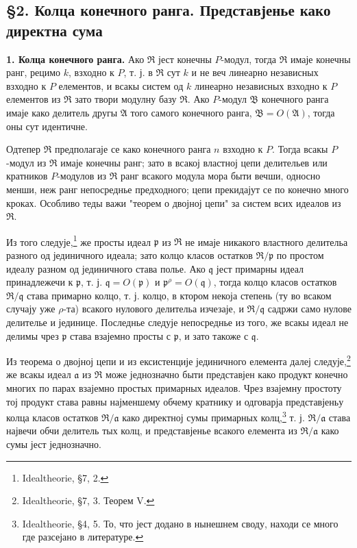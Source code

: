 \documentclass[11pt]{article}
\begin{document}
\setcounter{footnote}{16}

\subsection*{\S 2. Колца конечного ранга. Представјенье како директна сума}

\textbf{1. Колца конечного ранга.} Ако $\mathfrak R$ јест конечны $P$-модул, тогда $\mathfrak R$ имаје конечны ранг, рецимо $k$, взходно к $P$, т. ј. в $\mathfrak R$ сут $k$ и не веч линеарно независных взходно к $P$ елементов, и всакы систем од $k$ линеарно независных взходно к $P$ елементов из $\mathfrak R$ зато твори модулну базу $\mathfrak R$. Ако $P$-модул $\mathfrak B$ конечного ранга имаје како делитель другы $\mathfrak A$ того самого конечного ранга, $\mathfrak B=O(\mathfrak A)$, тогда оны сут идентичне.

Одтепер $\mathfrak R$ предполагаје се како конечного ранга $n$ взходно к $P$. Тогда всакы $P$-модул из $\mathfrak R$ имаје конечны ранг; зато в всакој властној цепи делительев или кратников $P$-модулов из $\mathfrak R$ ранг всакого модула мора быти вечши, односно менши, неж ранг непосреднье предходного; цепи прекидајут се по конечно много кроках. Особливо теды важи "теорем о двојној цепи" за систем всих идеалов из $\mathfrak R$.

Из того следује,\footnote{Idealtheorie, \S 7, 2.} же просты идеал $\mathfrak p$ из $\mathfrak R$ не имаје никакого властного делительа разного од јединичного идеала; зато колцо класов остатков $\mathfrak R/\mathfrak p$ по простом идеалу разном од јединичного става полье. Ако $\mathfrak q$ јест примарны идеал принадлежечи к $\mathfrak p$, т. ј. $\mathfrak q=O(\mathfrak p)$ и $\mathfrak p^{\rho}=O(\mathfrak q)$, тогда колцо класов остатков $\mathfrak R/\mathfrak q$ става примарно колцо, т. ј. колцо, в ктором некоја степень (ту во всаком случају уже $\rho$-та) всакого нулового делительа изчезаје, и $\mathfrak R/\mathfrak q$ садржи само нулове делителье и јединице. Последнье следује непосреднье из того, же всакы идеал не делимы чрез $\mathfrak p$ става взајемно просты с $\mathfrak p$, и зато такоже с $\mathfrak q$.

Из теорема о двојној цепи и из ексистенције јединичного елемента далеј следује,\footnote{Idealtheorie, \S 7, 3. Теорем V.} же всакы идеал $\mathfrak a$ из $\mathfrak R$ може једнозначно быти представјен како продукт конечно многих по парах взајемно простых примарных идеалов. Чрез взајемну простоту тој продукт става равны најменшему обчему кратнику и одговарја представјеньу колца класов остатков $\mathfrak R/\mathfrak a$ како директној сумы примарных колц,\footnote{Idealtheorie, \S 4, 5. То, что јест додано в нынешнем своду, находи се много где разсејано в литературе.} т. ј. $\mathfrak R/\mathfrak a$ става највечи обчи делитель тых колц, и представјенье всакого елемента из $\mathfrak R/\mathfrak a$ како сумы јест једнозначно.
\end{document}
